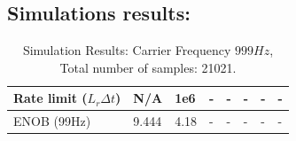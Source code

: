 \documentclass[a4paper]{article}
\begin{document}
\subsection*{Simulations results:}
\begin{table}[thb]
	\centering
\caption{Simulation Results: Carrier Frequency $ 999 Hz$, Total number of samples: 21021.}
	\begin{tabular}{ | m{3cm} | m{1.8cm}| m{1.8cm} | m{1.8cm}| m{1.8cm} |m{1.8cm}| m{1.8cm} |m{1.8cm}| } 
	  \hline
	  Rate limit ($L_{r} \Delta t$)& N/A & 1e6 & - & - & - & -  & -\\ 
	  \hline
	  ENOB (99Hz) & 9.444 & 4.18 & - & - & - & - & -\\ 
	  \hline
	\end{tabular}
\end{table}
\end{document}
